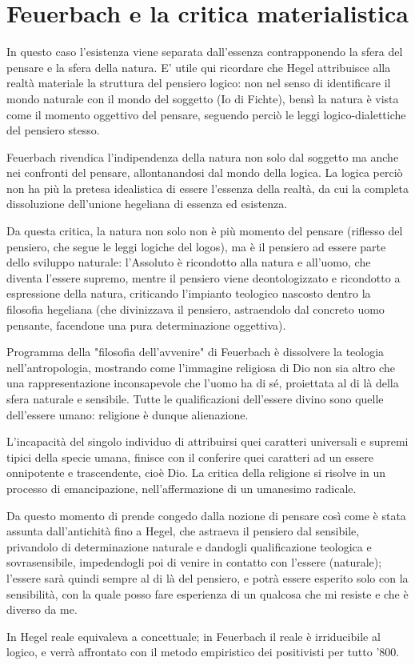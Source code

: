 \section{Feuerbach e la critica materialistica}

In questo caso l'esistenza viene separata dall'essenza contrapponendo la sfera del pensare e la sfera della natura. E' utile qui ricordare che Hegel attribuisce alla realtà materiale la struttura del pensiero logico: non nel senso di identificare il mondo naturale con il mondo del soggetto (Io di Fichte), bensì la natura è vista come il momento oggettivo del pensare, seguendo perciò le leggi logico-dialettiche del pensiero stesso.

Feuerbach rivendica l'indipendenza della natura non solo dal soggetto ma anche nei confronti del pensare, allontanandosi dal mondo della logica. La logica perciò non ha più la pretesa idealistica di essere l'essenza della realtà, da cui la completa dissoluzione dell'unione hegeliana  di essenza ed esistenza.

Da questa critica, la natura non solo non è più momento del pensare (riflesso del pensiero, che segue le leggi logiche del logos), ma è il pensiero ad essere parte dello sviluppo naturale: l'Assoluto è ricondotto alla natura e all'uomo, che diventa l'essere supremo, mentre il pensiero viene deontologizzato  e ricondotto a espressione della natura, criticando l'impianto teologico nascosto dentro la filosofia hegeliana (che divinizzava il pensiero, astraendolo dal concreto uomo pensante, facendone una pura determinazione oggettiva).

Programma della "filosofia dell'avvenire" di Feuerbach  è dissolvere la teologia nell'antropologia, mostrando come l'immagine religiosa di Dio non sia altro che una rappresentazione inconsapevole che l'uomo ha di sé, proiettata al di là della sfera naturale e sensibile. Tutte le qualificazioni dell'essere divino sono quelle dell'essere umano: religione è dunque alienazione.

L'incapacità del singolo individuo di attribuirsi quei caratteri universali e supremi tipici della specie umana, finisce con il conferire quei caratteri ad un essere onnipotente e trascendente, cioè Dio. La critica della religione si risolve in un processo di emancipazione, nell'affermazione di un umanesimo radicale.

Da questo momento di prende congedo dalla nozione di pensare così come è stata assunta dall'antichità fino a Hegel, che astraeva il pensiero dal sensibile, privandolo di determinazione naturale e dandogli qualificazione teologica e sovrasensibile, impedendogli poi di venire in contatto con l'essere (naturale); l'essere sarà quindi sempre al di là del pensiero, e potrà essere esperito solo con la sensibilità, con la quale posso fare esperienza di un qualcosa che mi resiste e che è diverso da me.

In Hegel reale equivaleva a concettuale; in Feuerbach il reale è irriducibile al logico, e verrà affrontato con il metodo empiristico dei positivisti per tutto '800.

